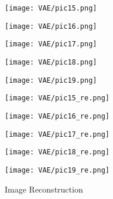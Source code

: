 \begin{figure}[t]
    \subfigure
    {
        \begin{minipage}{0.12\linewidth}
        \texttt{[image: VAE/pic15.png]}
        \end{minipage}
    }
    \subfigure
    {
        \begin{minipage}{0.12\linewidth}
        \texttt{[image: VAE/pic16.png]}
        \end{minipage}
    }
    \subfigure
    {
        \begin{minipage}{0.12\linewidth}
        \texttt{[image: VAE/pic17.png]}
        \end{minipage}
    }
    \subfigure
    {
        \begin{minipage}{0.12\linewidth}
        \texttt{[image: VAE/pic18.png]}
        \end{minipage}
    }
    \subfigure
    {
        \begin{minipage}{0.12\linewidth}
        \texttt{[image: VAE/pic19.png]}
        \end{minipage}
    }
    \subfigure
    {
        \begin{minipage}{0.12\linewidth}
        \texttt{[image: VAE/pic15\_re.png]}
        \end{minipage}
    }
    \subfigure
    {
        \begin{minipage}{0.12\linewidth}
        \texttt{[image: VAE/pic16\_re.png]}
        \end{minipage}
    }
    \subfigure
    {
        \begin{minipage}{0.12\linewidth}
        \texttt{[image: VAE/pic17\_re.png]}
        \end{minipage}
    }
    \subfigure
    {
        \begin{minipage}{0.12\linewidth}
        \texttt{[image: VAE/pic18\_re.png]}
        \end{minipage}
    }
    \subfigure
    {
        \begin{minipage}{0.12\linewidth}
        \texttt{[image: VAE/pic19\_re.png]}
        \end{minipage}
    }
    \caption{Image Reconstruction}
    \label{label}
\end{figure}